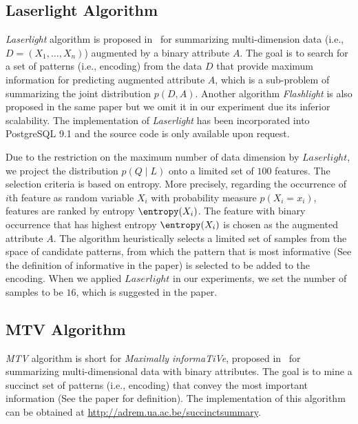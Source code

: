 \subsection{Laserlight Algorithm}
\label{appendix:Laserlight}
\textit{Laserlight} algorithm is proposed in~\cite{ElGebaly:2014:IIE:2735461.2735467} for summarizing multi-dimension data (i.e., $D=(X_1,\ldots,X_n)$) augmented by a binary attribute $A$. 
The goal is to search for a set of patterns (i.e., encoding) from the data $D$ that provide maximum information for predicting augmented attribute $A$, which is a sub-problem of summarizing the joint distribution $p(D,A)$. 
Another algorithm \textit{Flashlight} is also proposed in the same paper but we omit it in our experiment due its inferior scalability.
The implementation of \textit{Laserlight} has been incorporated into PostgreSQL 9.1 and the source code is only available upon request.

Due to the restriction on the maximum number of data dimension by $Laserlight$, we project the distribution $p(Q\;|\;L)$ onto a limited set of $100$ features.
The selection criteria is based on entropy. 
More precisely, regarding the occurrence of $i$th feature as random variable $X_i$ with probability measure $p(X_i=x_i)$, features are ranked by entropy $\entropy(X_i)$. 
The feature with binary occurrence that has highest entropy $\entropy(X_i)$ is chosen as the augmented attribute $A$.
The algorithm heuristically selects a limited set of samples from the space of candidate patterns, from which the pattern that is most informative (See the definition of informative in the paper) is selected to be added to the encoding.
When we applied $Laserlight$ in our experiments, we set the number of samples to be $16$, which is suggested in the paper.

\subsection{MTV Algorithm}
\textit{MTV} algorithm is short for \textit{Maximally informaTiVe}, proposed in~\cite{Mampaey:2012:SDS:2382577.2382580} for summarizing multi-dimensional data with binary attributes. 
The goal is to mine a succinct set of patterns (i.e., encoding) that convey the most important information (See the paper for definition). 
The implementation of this algorithm can be obtained at \href{http://adrem.ua.ac.be/succinctsummary}{http://adrem.ua.ac.be/succinctsummary}.

